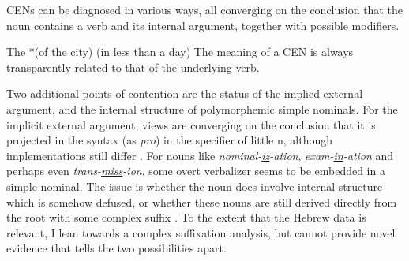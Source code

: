 \begin{exe}
\begin{xlist}
\begin{exe}
\begin{xlist}
\begin{exe}
\begin{exe}
\begin{xlist}
\begin{exe}
\begin{exe}
\begin{xlist}
\begin{exe}
\begin{xlist}
\begin{exe}
\begin{xlist}
\begin{exe}
\begin{xlist}
\begin{xlist}
\begin{exe}
\begin{xlist}
\begin{exe}
\begin{xlist}
\begin{exe}
\begin{exe}
\begin{exe}
\begin{xlist}
\begin{exe}
\begin{exe}
\begin{xlist}
\begin{exe}
\begin{xlist}
\begin{exe}
\begin{xlist}
\begin{exe}
\begin{xlist}
\begin{xlist}
\begin{exe}
\begin{xlist}
\begin{exe}
\begin{xlist}
\begin{exe}
\begin{xlist}
\begin{exe}
\begin{xlist}
\begin{exe}
\begin{exe}
\begin{exe}
\begin{exe}
\begin{exe}
\begin{xlist}
\begin{xlist}
\begin{exe}
\begin{xlist}
\begin{exe}
\begin{xlist}
\begin{exe}
\begin{exe}
\begin{exe}
\begin{xlist}
\begin{exe}
\begin{xlist}
\begin{exe}
\begin{xlist}
\begin{exe}
\begin{exe}
\begin{xlist}
\begin{exe}
CENs can be diagnosed in various ways, all converging on the conclusion that the noun contains a verb and its internal argument, together with possible modifiers.
 \begin{exe}
\ex  The  *(of the city) (in less than a day) 
 \z 
The meaning of a CEN is always transparently related to that of the underlying verb.

Two additional points of contention are the status of the implied external argument, and the internal structure of polymorphemic simple nominals. For the implicit external argument, views are converging on the conclusion that it is projected in the syntax (as \textit{pro}) in the specifier of little n, although implementations still differ \citep{bruening13,layering15}. For nouns like \emph{nominal-\underline{iz}-ation}, \emph{exam-\underline{in}-ation} and perhaps even \emph{trans-\underline{miss}-ion}, some overt verbalizer seems to be embedded in a simple nominal. The issue is whether the noun does involve internal structure which is somehow defused, or whether these nouns are still derived directly from the root with some complex suffix \citep{alexiadou01,alexiadou08,alexiadou09,alexiadou17,borer14lingua,moulton14,wood19lsa}. To the extent that the Hebrew data is relevant, I lean towards a complex suffixation analysis, but cannot provide novel evidence that tells the two possibilities apart.


\end{exe}
\end{exe}
\end{xlist}
\end{exe}
\end{exe}
\end{xlist}
\end{exe}
\end{xlist}
\end{exe}
\end{xlist}
\end{exe}
\end{exe}
\end{exe}
\end{xlist}
\end{exe}
\end{xlist}
\end{exe}
\end{xlist}
\end{xlist}
\end{exe}
\end{exe}
\end{exe}
\end{exe}
\end{exe}
\end{xlist}
\end{exe}
\end{xlist}
\end{exe}
\end{xlist}
\end{exe}
\end{xlist}
\end{exe}
\end{xlist}
\end{xlist}
\end{exe}
\end{xlist}
\end{exe}
\end{xlist}
\end{exe}
\end{xlist}
\end{exe}
\end{exe}
\end{xlist}
\end{exe}
\end{exe}
\end{exe}
\end{xlist}
\end{exe}
\end{xlist}
\end{exe}
\end{xlist}
\end{xlist}
\end{exe}
\end{xlist}
\end{exe}
\end{xlist}
\end{exe}
\end{xlist}
\end{exe}
\end{exe}
\end{xlist}
\end{exe}
\end{exe}
\end{xlist}
\end{exe}
\end{xlist}
\end{exe}
